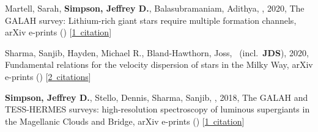 \item[{\color{numcolor}\scriptsize3}] Martell, Sarah, \textbf{Simpson, Jeffrey D.}, Balasubramaniam, Adithya, \etal, 2020, The GALAH survey: Lithium-rich giant stars require multiple formation channels, arXiv e-prints () [\href{https://ui.adsabs.harvard.edu/#abs/2020arXiv200602106M}{1~citation}]

\item[{\color{numcolor}\scriptsize2}] Sharma, Sanjib, Hayden, Michael R., Bland-Hawthorn, Joss, \etal\ (incl.\ \textbf{JDS}), 2020, Fundamental relations for the velocity dispersion of stars in the Milky Way, arXiv e-prints () [\href{https://ui.adsabs.harvard.edu/#abs/2020arXiv200406556S}{2~citations}]

\item[{\color{numcolor}\scriptsize1}] \textbf{Simpson, Jeffrey D.}, Stello, Dennis, Sharma, Sanjib, \etal, 2018, The GALAH and TESS-HERMES surveys: high-resolution spectroscopy of luminous supergiants in the Magellanic Clouds and Bridge, arXiv e-prints () [\href{https://ui.adsabs.harvard.edu/#abs/2018arXiv180405900S}{1~citation}]
